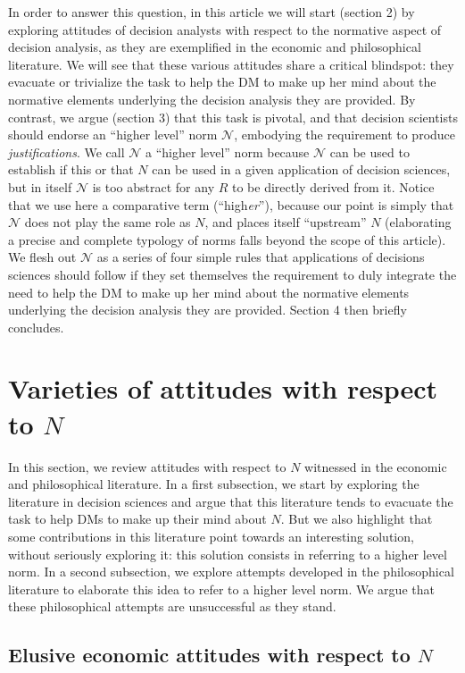 \documentclass[preprint, french, english, 11pt, authoryear]{elsarticle}%
\newcommand{\protectforpdf}[1]{\texorpdfstring{\ensuremath{#1}}{#1}}
\newcommand{\adv}{\mathscr{N}}
\begin{document}
In order to answer this question, in this article we will start (section 2) by exploring attitudes of decision analysts with respect to the normative aspect of decision analysis, as they are exemplified in the economic and philosophical literature. We will see that these various attitudes share a critical blindspot: they evacuate or trivialize the task to help the \ac{DM} to make up her mind about the normative elements underlying the decision analysis they are provided. By contrast, we argue (section 3) that this task is pivotal, and that decision scientists should endorse an “higher level” norm $\adv$, embodying the requirement to produce \emph{justifications}. We call $\adv$ a “higher level” norm because $\adv$ can be used to establish if this or that $N$ can be used in a given application of decision sciences, but in itself $\adv$ is too abstract for any $R$ to be directly derived from it. Notice that we use here a comparative term (“high\emph{er}”), because our point is simply that $\adv$ does not play the same role as $N$, and places itself “upstream” $N$ (elaborating a precise and complete typology of norms falls beyond the scope of this article). We flesh out $\adv$ as a series of four simple rules that applications of decisions sciences should follow if they set themselves the requirement to duly integrate the need to help the \ac{DM} to make up her mind about the normative elements underlying the decision analysis they are provided. Section 4 then briefly concludes.

\section{Varieties of attitudes with respect to \protectforpdf{N}}
\label{sec:existing}
In this section, we review attitudes with respect to $N$ witnessed in the economic and philosophical literature. In a first subsection, we start by exploring the literature in decision sciences and argue that this literature tends to evacuate the task to help \acp{DM} to make up their mind about $N$. But we also highlight that some contributions in this literature point towards an interesting solution, without seriously exploring it: this solution consists in referring to a higher level norm. In a second subsection, we explore attempts developed in the philosophical literature to elaborate this idea to refer to a higher level norm. We argue that these philosophical attempts are unsuccessful as they stand.

\subsection{Elusive economic attitudes with respect to \protectforpdf{N}}
\end{document}
